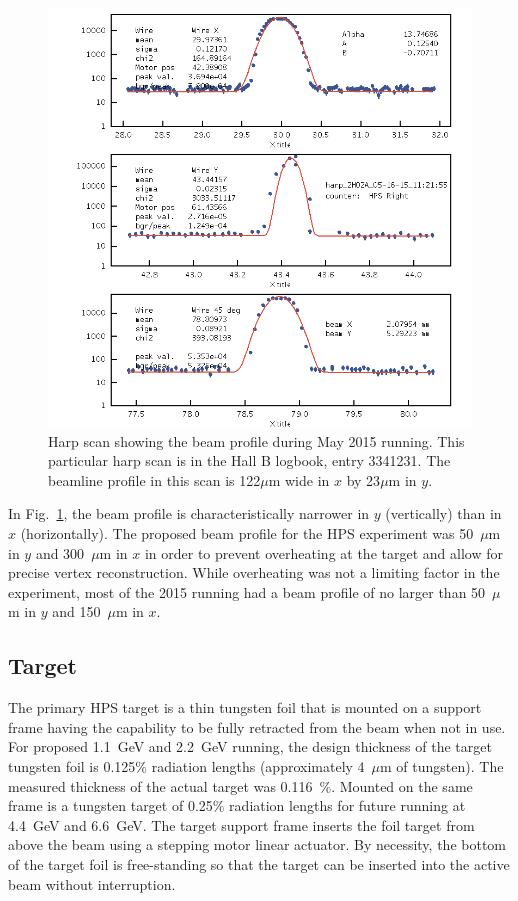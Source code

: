 \documentclass[12pt]{report}
\begin{document}
\begin{figure}[H]
  \centering
      \includegraphics[width=1.0\textwidth]{pics/experiment/harpScan.png}
  \caption{Harp scan showing the beam profile during May 2015 running. This particular harp scan is in the Hall B logbook, entry 3341231. The beamline profile in this scan is 122$\mu$m wide in $x$ by 23$\mu$m in $y$.}
  \label{Figure:harpScan}
\end{figure}

In Fig.~\ref{Figure:harpScan}, the beam profile is characteristically narrower in $y$ (vertically) than in $x$ (horizontally). The proposed beam profile for the HPS experiment was 50~$\mu$m in $y$ and 300~$\mu$m in $x$ in order to prevent overheating at the target and allow for precise vertex reconstruction. While overheating was not a limiting factor in the experiment, most of the 2015 running had a beam profile of no larger than 50~$\mu$m in $y$ and 150~$\mu$m in $x$. 

\subsection{Target}

The primary HPS target is a thin tungsten foil that is mounted on a support frame having the capability to be fully retracted from the beam when not in use. For proposed 1.1~GeV and 2.2~GeV running, the design thickness of the target tungsten foil is 0.125$\%$ radiation lengths (approximately 4~$\mu$m of tungsten). The measured thickness of the actual target was 0.116~$\%$. Mounted on the same frame is a tungsten target of 0.25$\%$ radiation lengths for future running at 4.4~GeV and 6.6~GeV. The target support frame inserts the foil target from above the beam using a stepping motor linear actuator. By necessity, the bottom of the target foil is free-standing so that the target can be inserted into the active beam without interruption.  
\end{document}
